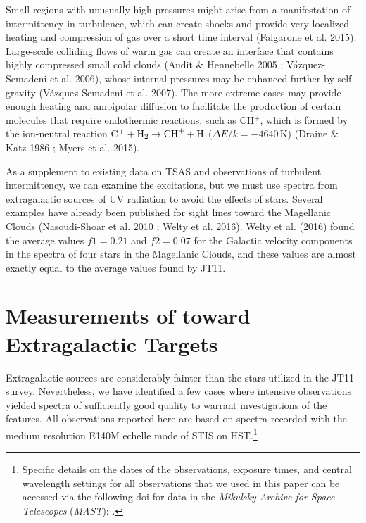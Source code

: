 \documentclass[modern]{aastex63}
\begin{document}
Small regions with unusually high pressures might arise from a manifestation of intermittency 
in turbulence, which can create shocks and provide very localized heating and compression of 
gas over a short time interval (Falgarone et al. 2015).  Large-scale colliding flows of warm gas 
can create an interface that contains highly compressed small cold clouds (Audit \& Hennebelle 
2005 ; Vázquez-Semadeni et al. 2006), whose internal pressures may be enhanced further by 
self gravity (Vázquez-Semadeni et al. 2007).  The more extreme cases may provide enough 
heating and ambipolar diffusion to facilitate the production of certain molecules that require 
endothermic reactions, such as CH$^+$, which is formed by the ion-neutral reaction C$^+ +{\rm 
H}_2\rightarrow {\rm CH}^++{\rm H}$ ($\Delta E/k=-4640$\,K) (Draine \& Katz 1986 ; Myers et 
al. 2015).

As a supplement to existing data on TSAS and observations of turbulent intermittency, we can 
examine the  excitations, but we must use spectra from extragalactic sources of UV 
radiation to avoid the effects of stars.  Several examples have already been published  for sight 
lines toward the Magellanic Clouds (Nasoudi-Shoar et al. 2010 ; Welty et al. 2016). Welty et al. 
(2016) found the average values $f1=0.21$ and $f2=0.07$ for the Galactic velocity components 
in the spectra of four stars in the Magellanic Clouds, and these values are almost exactly equal 
to the average values found by JT11.

\section{Measurements of  toward Extragalactic Targets}\label{sec:extragalactic}

Extragalactic sources are considerably fainter than the stars utilized in the JT11 survey.  
Nevertheless, we have identified a few cases where intensive observations yielded spectra of 
sufficiently good quality to warrant investigations of the  features.  All observations 
reported here are based on spectra recorded with the medium resolution E140M echelle mode 
of STIS on HST.\footnote{Specific details on the dates of the observations, exposure times, and 
central wavelength settings for all observations that we used in this paper can be accessed via 
the following doi for data in the {\it Mikulsky Archive for Space Telescopes\/} ({\it MAST\/}): 
.}
\end{document}
